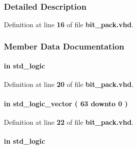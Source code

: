 \subsubsection{Detailed Description}


Definition at line {\bf 16} of file {\bf bit\+\_\+pack.\+vhd}.



\subsubsection{Member Data Documentation}
\paragraph[{clk}]{ {\bfseries \textcolor{keywordflow}{in}\textcolor{vhdlchar}{ }} {\bfseries \textcolor{comment}{std\+\_\+logic}\textcolor{vhdlchar}{ }} \hspace{0.3cm}{\ttfamily [Port]}}\label{classbit__pack_a4a4609c199d30b3adebbeb3a01276ec5}


Definition at line {\bf 20} of file {\bf bit\+\_\+pack.\+vhd}.

\paragraph[{data\+\_\+in}]{ {\bfseries \textcolor{keywordflow}{in}\textcolor{vhdlchar}{ }} {\bfseries \textcolor{comment}{std\+\_\+logic\+\_\+vector}\textcolor{vhdlchar}{ }\textcolor{vhdlchar}{(}\textcolor{vhdlchar}{ }\textcolor{vhdlchar}{ } \textcolor{vhdldigit}{63} \textcolor{vhdlchar}{ }\textcolor{keywordflow}{downto}\textcolor{vhdlchar}{ }\textcolor{vhdlchar}{ } \textcolor{vhdldigit}{0} \textcolor{vhdlchar}{ }\textcolor{vhdlchar}{)}\textcolor{vhdlchar}{ }} \hspace{0.3cm}{\ttfamily [Port]}}\label{classbit__pack_a4964e64890b447c67ae1dd95413ec8a5}


Definition at line {\bf 22} of file {\bf bit\+\_\+pack.\+vhd}.

\paragraph[{data\+\_\+in\+\_\+valid}]{ {\bfseries \textcolor{keywordflow}{in}\textcolor{vhdlchar}{ }} {\bfseries \textcolor{comment}{std\+\_\+logic}\textcolor{vhdlchar}{ }} \hspace{0.3cm}{\ttfamily [Port]}}\label{classbit__pack_a9fe0a9f38dccdb91d670106b4bbac6fd}


